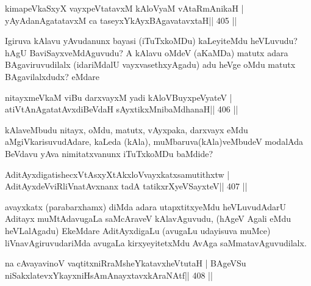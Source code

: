
\begin{shl}
kimapeVkaSxyX vayxpeVtatavxM kAloV\s yaM vAtaRmAnikaH |
yAyAdanAgatatavxM ca taseyxYkAyxBAgavatavxtaH\hfill || 405 ||
\end{shl}

\begin{artha}
Igiruva kAlavu yAvudanunx bayasi (iTuTxkoMDu) kaLeyiteMdu heVLuvudu? hAgU BaviSayxveMdAguvudu? A kAlavu oMdeV (aKaMDa) matutx adara BAgaviruvudilalx (idariMdalU vayxvasethxyAgadu) adu heVge oMdu matutx BAgavilalxdudx? eMdare
\end{artha}

\begin{shl}
nitayxmeVkaM viBu darxvayxM yadi kAloV\s BuyxpeVyateV |
atiVtAnAgatatAvxdiBeVdaH sAyxtikxMnibaMdhanaH\hfill || 406 ||
\end{shl}

\begin{artha}
kAlaveMbudu nitayx, oMdu, matutx, vAyxpaka, darxvayx eMdu aMgiVkarisuvu\-dAdare, kaLeda (kAla), muMbaruva(kAla)veMbudeV modalAda BeVdavu yAva nimitatxvanunx iTuTxkoMDu baMdide?
\end{artha}

\begin{shl}
AditAyxdigatishecxVtAsxyXtAkxloV\s vayxkatxsamutithxtw |
AditAyxdeVviRliVnatAvxnanx tadA tatikxrXyeVSayxteV\hfill || 407 ||
\end{shl}

\begin{artha}
avayxkatx (parabarxhamx) diMda adara utapxtitxyeMdu heVLuvudAdarU Aditayx \break 	muMtAdavugaLa saMcAraveV kAlavAguvudu, (hAgeV Agali eMdu heVLa\-lAgadu) EkeMdare AditAyxdigaLu (avugaLu udayisuva muMce) liVnavAgiruvu\-dariMda avugaLa kirxyeyitetxMdu AvAga saMmatavAguvudilalx.
\end{artha}


\begin{shl}
na cAvayavinoV vaqtitxniRraMsheYkatavxheVtutaH |
BAgeVSu niSakxlatevxYkayxniHsAmAnayxtavxkAraNAtf\hfill || 408 ||
\end{shl}

